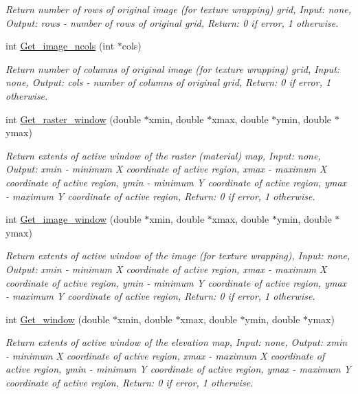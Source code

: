\begin{CompactItemize}
\begin{CompactList}\small\item\em Return number of rows of original image (for texture wrapping) grid, Input: none, Output: rows - number of rows of original grid, Return: 0 if error, 1 otherwise. \item\end{CompactList}\item 
int \hyperlink{GisApi_8C_a57}{Get\_\-image\_\-ncols} (int $\ast$cols)
\begin{CompactList}\small\item\em Return number of columns of original image (for texture wrapping) grid, Input: none, Output: cols - number of columns of original grid, Return: 0 if error, 1 otherwise. \item\end{CompactList}\item 
int \hyperlink{GisApi_8C_a58}{Get\_\-raster\_\-window} (double $\ast$xmin, double $\ast$xmax, double $\ast$ymin, double $\ast$ymax)
\begin{CompactList}\small\item\em Return extents of active window of the raster (material) map, Input: none, Output: xmin - minimum X coordinate of active region, xmax - maximum X coordinate of active region, ymin - minimum Y coordinate of active region, ymax - maximum Y coordinate of active region, Return: 0 if error, 1 otherwise. \item\end{CompactList}\item 
int \hyperlink{GisApi_8C_a59}{Get\_\-image\_\-window} (double $\ast$xmin, double $\ast$xmax, double $\ast$ymin, double $\ast$ymax)
\begin{CompactList}\small\item\em Return extents of active window of the image (for texture wrapping), Input: none, Output: xmin - minimum X coordinate of active region, xmax - maximum X coordinate of active region, ymin - minimum Y coordinate of active region, ymax - maximum Y coordinate of active region, Return: 0 if error, 1 otherwise. \item\end{CompactList}\item 
int \hyperlink{GisApi_8C_a60}{Get\_\-window} (double $\ast$xmin, double $\ast$xmax, double $\ast$ymin, double $\ast$ymax)
\begin{CompactList}\small\item\em Return extents of active window of the elevation map, Input: none, Output: xmin - minimum X coordinate of active region, xmax - maximum X coordinate of active region, ymin - minimum Y coordinate of active region, ymax - maximum Y coordinate of active region, Return: 0 if error, 1 otherwise. \item\end{CompactList}\item 

\end{CompactItemize}
